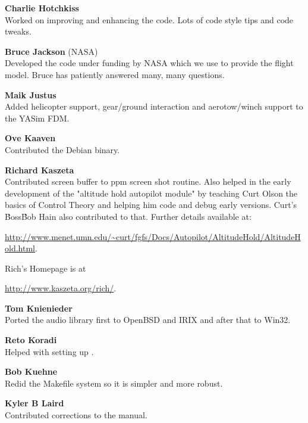 \noindent \textbf{Charlie Hotchkiss}\\
Worked on improving and enhancing the  code.
Lots of code style tips and code tweaks.
 \medskip

\noindent \textbf{Bruce Jackson} (NASA)\\
   Developed the  code under funding by NASA which we use to provide the
   flight model. Bruce has patiently answered many, many questions.
  \medskip

\noindent \textbf{Maik Justus} \\
  Added helicopter support, gear/ground interaction and aerotow/winch support
  to the YASim FDM.
  \medskip

\noindent \textbf{Ove Kaaven} \\
 Contributed the Debian binary.
 \medskip

\noindent \textbf{Richard Kaszeta} \\
  Contributed screen buffer to ppm screen shot routine.
  Also helped in the early development of the "altitude
  hold autopilot module" by teaching Curt Olson the basics of Control Theory
  and helping him code and debug early versions. Curt's \'Boss\' Bob Hain
  also contributed to that.  Further details available at:
 \medskip

  \href{http://www.menet.umn.edu/~curt/fgfs/Docs/Autopilot/AltitudeHold/AltitudeHold.html}{http://www.menet.umn.edu/\~{}curt/fgfs/Docs/Autopilot/AltitudeHold/AltitudeHold.html}.
  \medskip

\noindent
  Rich's Homepage is at
  \medskip

  \href{http://www.kaszeta.org/rich/}{http://www.kaszeta.org/rich/}.
  \medskip

\noindent \textbf{Tom Knienieder}\\
  Ported the audio library first to OpenBSD and IRIX and after that to Win32.
 \medskip

\noindent \textbf{Reto Koradi}\\
  Helped with setting up .
 \medskip

\noindent \textbf{Bob Kuehne}\\
  Redid the Makefile system so it is simpler and more robust.
 \medskip

\noindent \textbf{Kyler B Laird}\\
 Contributed corrections to the manual.
 \medskip

